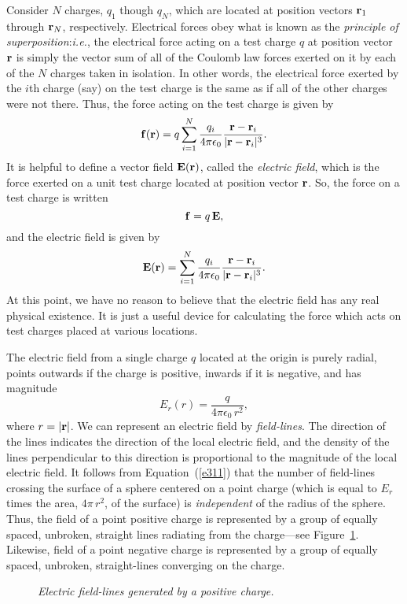 Consider $N$ charges, $q_1$ though $q_N$, which are located at position vectors
${\bf r}_1$ through ${\bf r}_N$, respectively. Electrical forces obey what is known as
the {\em principle of superposition}:{\em i.e.}, the electrical force acting on a test charge
$q$ at position vector ${\bf r}$ is simply the vector sum of all of the
Coulomb law forces exerted on it by each of the $N$ charges taken in isolation. In other
words, the electrical force exerted by the $i$th charge (say) on the test charge is
the same as if all of the other charges were not there. Thus, the force acting
on the test charge is given by
\begin{equation}
{\bf f}({\bf r}) = q \sum_{i=1}^N \frac{q_i}{4\pi\epsilon_0}
\frac{{\bf r}-{\bf r}_i}{|{\bf r}-{\bf r}_i|^3}.
\end{equation}
It is helpful to define a vector field ${\bf E}({\bf r})$, called the
{\em electric field}, which is the force exerted on a unit test charge located at
position vector ${\bf r}$. So, the force on a test charge is written
\begin{equation}\label{e39}
{\bf f} = q\,{\bf E},
\end{equation}
and the electric field is given by
\begin{equation}\label{e310}
{\bf E}({\bf r}) = \sum_{i=1}^N \frac{q_i}{4\pi\epsilon_0} 
\frac{{\bf r}- {\bf r}_i}{|{\bf r}-{\bf r}_i|^3}.
\end{equation}
At this point, we have no reason to believe that the electric field has any
real physical existence. It is just a useful device for calculating the force which
acts on test charges placed at  various locations.

The electric field from a single charge $q$ located at the origin is purely radial,
points outwards if the charge is positive, inwards if it is negative, and has
magnitude
\begin{equation}\label{e311}
E_r (r) = \frac{q}{4\pi\epsilon_0\,r^2},
\end{equation}
where $r= |{\bf r}|$.
We can represent an electric field by {\em field-lines}.
 The direction of the lines
indicates 
the direction of the
local electric field, and the density of the lines perpendicular to this direction
is proportional to the magnitude of the local electric field.
It follows from Equation~(\ref{e311}) that the number of field-lines crossing the
surface of a sphere centered on a point charge (which is equal to
$E_r$ times the area, $4\pi\,r^2$, of the surface) is {\em independent}\/
of the radius of the sphere.
Thus, the field of a point positive charge is represented by a group of equally
spaced, unbroken, straight lines radiating from the charge---see Figure~\ref{f23}.
Likewise, field of a point negative charge is represented by a group of
equally spaced, unbroken, straight-lines converging on the charge.
\begin{figure}
\centerline{}
\caption{\em Electric field-lines generated by a positive charge.}\label{f23}
\end{figure}

